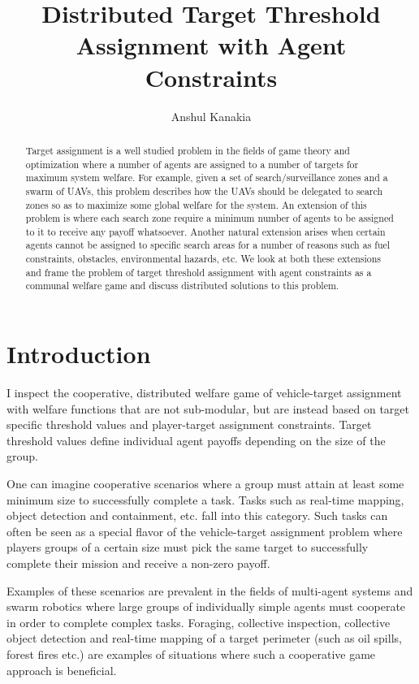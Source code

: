 \documentclass[11pt, onecolumn, compsoc, letterpaper]{article}
\title{Distributed Target Threshold Assignment with Agent Constraints}
\author{Anshul Kanakia}
\date{}
\begin{document}
\maketitle

\begin{abstract}
Target assignment is a well studied problem in the fields of game theory and optimization where a number of agents are assigned to a number of targets for maximum system welfare. For example, given a set of search/surveillance zones and a swarm of UAVs, this problem describes how the UAVs should be delegated to search zones so as to maximize some global welfare for the system. An extension of this problem is where each search zone require a minimum number of agents to be assigned to it to receive any payoff whatsoever. Another natural extension arises when certain agents cannot be assigned to specific search areas for a number of reasons such as fuel constraints, obstacles, environmental hazards, etc. We look at both these extensions and frame the problem of target threshold assignment with agent constraints as a communal welfare game and discuss distributed solutions to this problem.
\end{abstract}

\section{Introduction}
I inspect the cooperative, distributed welfare game of vehicle-target assignment with welfare functions that are not sub-modular, but are instead based on target specific threshold values and player-target assignment constraints. Target threshold values define individual agent payoffs depending on the size of the group.

One can imagine cooperative scenarios where a group must attain at least some minimum size to successfully complete a task. Tasks such as real-time mapping, object detection and containment, etc. fall into this category. Such tasks can often be seen as a special flavor of the vehicle-target assignment problem where players groups of a certain size  must pick the same target to successfully complete their mission and receive a non-zero payoff.

Examples of these scenarios are prevalent in the fields of multi-agent systems and swarm robotics where large groups of individually simple agents must cooperate in order to complete complex tasks. Foraging, collective inspection, collective object detection and real-time mapping of a target perimeter (such as oil spills, forest fires etc.) are examples of situations where such a cooperative game approach is beneficial. 
\end{document}
